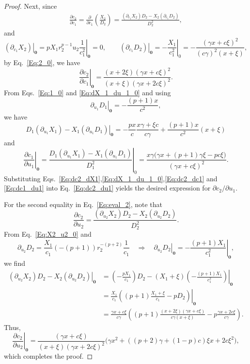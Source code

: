 \documentclass[11pt]{article}
\theoremstyle{definition}
\begin{document}
\begin{proof}
	Next, since
	\begin{align*}
		\frac{\partial c_2}{\partial c_1} = \frac{\partial}{\partial c_1} \left(\frac{X_2}{D_2}\right) = \frac{(\partial_{c_1}X_2) D_2 - X_2 (\partial_{c_1}D_2)}{D_2^2} ,
	\end{align*}
	and
	$$ \left. (\partial_{c_1}X_2) \right|_{\mathbf{0}} = \left. pX_1 r_2^{p-1} u_2 \frac{1}{c_1^{2}} \right|_{\mathbf{0}} = 0, \qquad  \left. (\partial_{c_1}D_2) \right|_{\mathbf{0}} = \left. - \frac{X_1}{c_1^2} \right|_{0} = - \frac{(\gamma x + c \xi)^2}{(c\gamma)^2 (x + \xi)},
	$$
	by Eq.~\eqref{Eq:2_0},
	we have
	\begin{equation}
	\left.\frac{\partial c_2}{\partial c_1}\right|_{\mathbf{0}}
	= \frac{(x+2\xi)(\gamma x + c\xi)^2}{(x+\xi)(\gamma x + 2c\xi)^2 }. \label{Eq:dc2_dc1}
	\end{equation}
	From Eqs.~\eqref{Eq:1_0} and \eqref{Eq:dX_1_du_1_0} and using
	$$\left. \partial_{u_1} D_1 \right|_{\mathbf{0}} = - \frac{(p+1)x}{c^2},$$
	we have
	$$
	\left. D_1 (\partial_{u_1} X_1) - X_1 (\partial_{u_1} D_1) \right|_{\mathbf{0}}
	=  -\frac{px}{c} \frac{x \gamma + \xi c}{c \gamma} + \frac{(p+1)x}{c^2}(x + \xi )
	$$
	and
	\begin{equation}
	\left.\frac{\partial c_1}{\partial u_1}\right|_{\mathbf{0}}
	=\left. \frac{D_1 (\partial_{u_1} X_1) - X_1 (\partial_{u_1} D_1) }{D_1^2} \right|_{0}=  \frac{x\gamma\big(\gamma x + (p+1)\gamma\xi - p c\xi\big)}{(\gamma x + c \xi)^2}. \label{Eq:dc1_du1}
	\end{equation}
	Substituting Eqs.~\eqref{Eq:dc2_dX1},\eqref{Eq:dX_1_du_1_0},\eqref{Eq:dc2_dc1} and \eqref{Eq:dc1_du1} into Eq.~\eqref{Eq:dc2_du1} yields the desired expression for $\partial c_2 / \partial u_1$.

	For the second equality in Eq.~\eqref{Eq:eval_2}, note that
	$$
	\frac{\partial c_2}{\partial u_2}
	=\frac{(\partial_{u_2}X_2) D_2 - X_2 (\partial_{u_2}D_2)}{D_2^2}.
	$$
	From Eq.~\eqref{Eq:X2_u2_0} and
	$$
	\partial_{u_2} D_2 = \frac{X_1}{c_1} (-(p+1)) r_2^{-(p+2)}\frac{1}{c_1}
	\quad\Rightarrow\quad
	\left.\partial_{u_2}D_2\right|_{\mathbf{0}} = \left. -\frac{(p+1) X_1}{c_1^2} \right|_{\mathbf{0}},
	$$
	we find
	\begin{align*}
	 \left. (\partial_{u_2}X_2)D_2 - X_2(\partial_{u_2}D_2) \right|_{\mathbf{0}}
	&= \left. \left(-\frac{p X_1}{c_1}\right)D_2 - (X_1+\xi)\left(-\frac{(p+1) X_1}{c_1^2}\right) \right|_{\mathbf{0}} \\
	&= \left. \frac{X_1}{c_1}\left( (p+1) \frac{X_1 + \xi}{c_1} - p D_2 \right) \right|_{\mathbf{0}} \\
	&=  \frac{\gamma x + c\xi}{c \gamma } 
	\left( (p+1)\frac{(x+2\xi)(\gamma x + c\xi)}{c\gamma(x+\xi)} -p\frac{\gamma x+2c\xi}{c \gamma}\right).
	\end{align*}
	Thus,
	$$
	\left.\frac{\partial c_2}{\partial u_2}\right|_{\mathbf{0}}
	= \frac{(\gamma x + c\xi)}{(x+\xi)(\gamma x + 2c\xi)^2}
	\Big( \gamma x^2 + ((p+2)\gamma + (1-p)c ) \xi x + 2c\xi^2 \Big),
	$$
	which completes the proof.
\end{proof}
\end{document}
